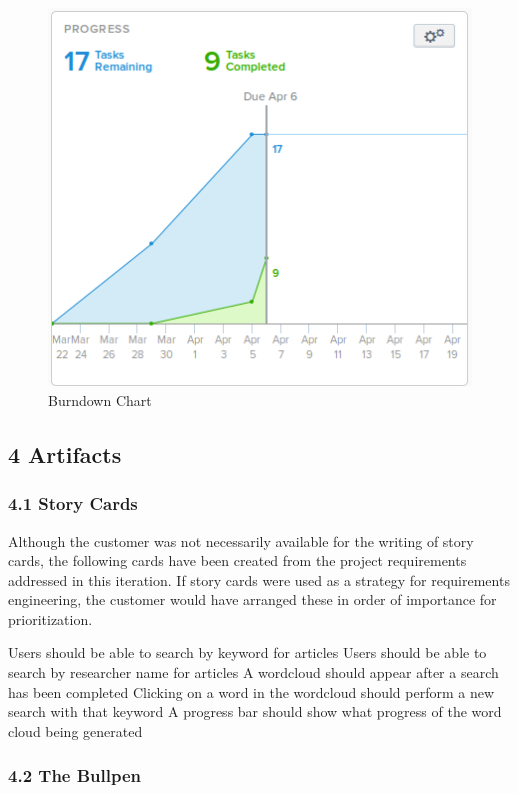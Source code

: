 \documentclass[]{article}
\begin{document}
\begin{figure}[htbp]
\centering
\includegraphics{burndown.png}
\caption{Burndown Chart}
\end{figure}

\subsection{4 Artifacts}\label{artifacts}

\subsubsection{4.1 Story Cards}\label{story-cards}

Although the customer was not necessarily available for the writing of
story cards, the following cards have been created from the project
requirements addressed in this iteration. If story cards were used as a
strategy for requirements engineering, the customer would have arranged
these in order of importance for prioritization.

Users should be able to search by keyword for articles Users should be
able to search by researcher name for articles A wordcloud should appear
after a search has been completed Clicking on a word in the wordcloud
should perform a new search with that keyword A progress bar should show
what progress of the word cloud being generated

\subsubsection{4.2 The Bullpen}\label{the-bullpen}
\end{document}
